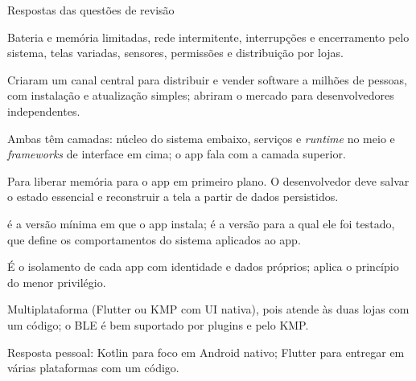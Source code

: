 \documentclass[aspectratio=169,10pt]{beamer}
\begin{document}
\begin{frame}{Respostas das questões de revisão}
  \begin{respostas}
    \item Bateria e memória limitadas, rede intermitente, interrupções e encerramento pelo sistema, telas variadas, sensores, permissões e distribuição por lojas.
    \item Criaram um canal central para distribuir e vender software a milhões de pessoas, com instalação e atualização simples; abriram o mercado para desenvolvedores independentes.
    \item Ambas têm camadas: núcleo do sistema embaixo, serviços e \emph{runtime} no meio e \emph{frameworks} de interface em cima; o app fala com a camada superior.
    \item Para liberar memória para o app em primeiro plano. O desenvolvedor deve salvar o estado essencial e reconstruir a tela a partir de dados persistidos.
    \item {} é a versão mínima em que o app instala;  é a versão para a qual ele foi testado, que define os comportamentos do sistema aplicados ao app.
    \item É o isolamento de cada app com identidade e dados próprios; aplica o princípio do menor privilégio.
    \item Multiplataforma (Flutter ou KMP com UI nativa), pois atende às duas lojas com um código; o BLE é bem suportado por plugins e pelo KMP.
    \item Resposta pessoal: Kotlin para foco em Android nativo; Flutter para entregar em várias plataformas com um código.
  \end{respostas}
\end{frame}

\end{document}

